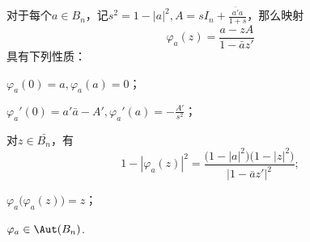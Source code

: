 \begin{theorem}\label{thm9.6.2}
对于每个$a\in B_n$，记$s^2=1-|a|^2,A=sI_n+\frac{\bar {a'}a}{1+s}$，那么映射
\[\varphi_a(z)=\frac{a-zA}{1-\bar az'}\]
具有下列性质：
\begin{eenum}
 \item \label{thm9.6.2.1} $\varphi_a(0)=a,\varphi_a(a)=0$；
 \item \label{thm9.6.2.2} $\varphi_a'(0)=a'\bar a-A',\varphi_a'(a)=-\frac{A'}{s^2}；$
 \item \label{thm9.6.2.3} 对$z\in\bar{B_n}$，有
 \[1-|\varphi_a(z)|^2=\frac{\big(1-|a|^2\big)\big(1-|z|^2\big)}{|1-\bar az'|^2};\]
 \item \label{thm9.6.2.4} $\varphi_a\big(\varphi_a(z)\big)=z$；
 \item \label{thm9.6.2.5} $\varphi_a\in\Aut(B_n)$.
\end{eenum}
\end{theorem}

